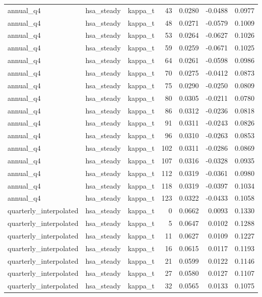 \begin{tabular}{lllrrrr}
annual\_q4 & hsa\_steady & kappa\_t & 43 & 0.0280 & -0.0488 & 0.0977 \\
annual\_q4 & hsa\_steady & kappa\_t & 48 & 0.0271 & -0.0579 & 0.1009 \\
annual\_q4 & hsa\_steady & kappa\_t & 53 & 0.0264 & -0.0627 & 0.1026 \\
annual\_q4 & hsa\_steady & kappa\_t & 59 & 0.0259 & -0.0671 & 0.1025 \\
annual\_q4 & hsa\_steady & kappa\_t & 64 & 0.0261 & -0.0598 & 0.0986 \\
annual\_q4 & hsa\_steady & kappa\_t & 70 & 0.0275 & -0.0412 & 0.0873 \\
annual\_q4 & hsa\_steady & kappa\_t & 75 & 0.0290 & -0.0250 & 0.0809 \\
annual\_q4 & hsa\_steady & kappa\_t & 80 & 0.0305 & -0.0211 & 0.0780 \\
annual\_q4 & hsa\_steady & kappa\_t & 86 & 0.0312 & -0.0236 & 0.0818 \\
annual\_q4 & hsa\_steady & kappa\_t & 91 & 0.0311 & -0.0243 & 0.0826 \\
annual\_q4 & hsa\_steady & kappa\_t & 96 & 0.0310 & -0.0263 & 0.0853 \\
annual\_q4 & hsa\_steady & kappa\_t & 102 & 0.0311 & -0.0286 & 0.0869 \\
annual\_q4 & hsa\_steady & kappa\_t & 107 & 0.0316 & -0.0328 & 0.0935 \\
annual\_q4 & hsa\_steady & kappa\_t & 112 & 0.0319 & -0.0361 & 0.0980 \\
annual\_q4 & hsa\_steady & kappa\_t & 118 & 0.0319 & -0.0397 & 0.1034 \\
annual\_q4 & hsa\_steady & kappa\_t & 123 & 0.0322 & -0.0433 & 0.1058 \\
quarterly\_interpolated & hsa\_steady & kappa\_t & 0 & 0.0662 & 0.0093 & 0.1330 \\
quarterly\_interpolated & hsa\_steady & kappa\_t & 5 & 0.0647 & 0.0102 & 0.1288 \\
quarterly\_interpolated & hsa\_steady & kappa\_t & 11 & 0.0627 & 0.0109 & 0.1227 \\
quarterly\_interpolated & hsa\_steady & kappa\_t & 16 & 0.0615 & 0.0117 & 0.1193 \\
quarterly\_interpolated & hsa\_steady & kappa\_t & 21 & 0.0599 & 0.0122 & 0.1146 \\
quarterly\_interpolated & hsa\_steady & kappa\_t & 27 & 0.0580 & 0.0127 & 0.1107 \\
quarterly\_interpolated & hsa\_steady & kappa\_t & 32 & 0.0565 & 0.0133 & 0.1075 \\

\end{tabular}
